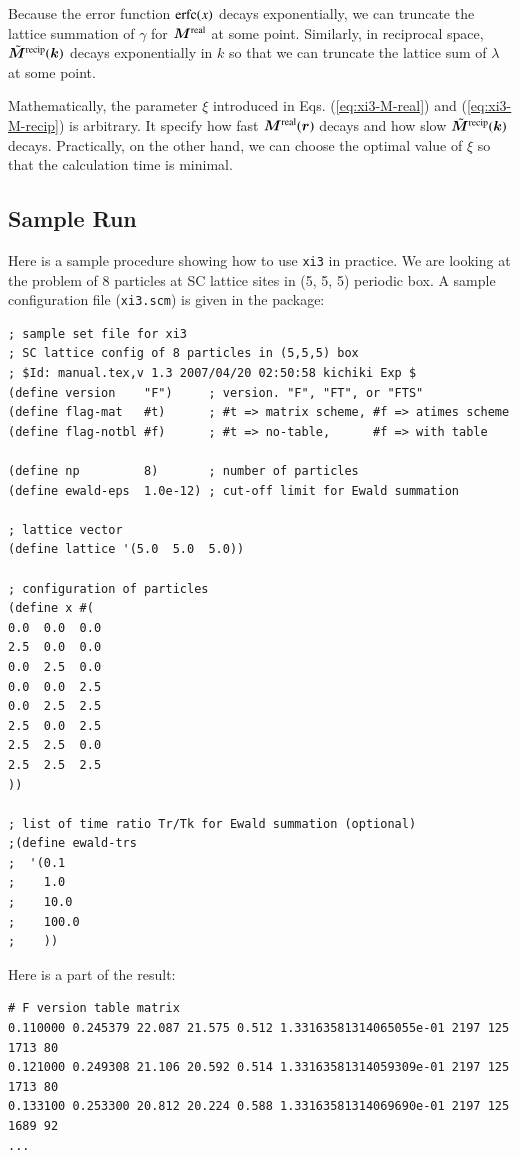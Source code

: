 \documentclass{book}
\begin{document}
Because the error function ${\rm erfc}(x)$ decays exponentially,
we can truncate the lattice summation of $\gamma$ for $\bm{M}^{\rm real}$
at some point.
Similarly, in reciprocal space, $\tilde{\bm{M}}^{\rm recip}(\bm{k})$
decays exponentially in $k$ so that we can truncate the lattice sum
of $\lambda$ at some point.

Mathematically, the parameter $\xi$ introduced in
Eqs. (\ref{eq:xi3-M-real}) and (\ref{eq:xi3-M-recip})
is arbitrary. It specify how fast $\bm{M}^{\rm real}(\bm{r})$ decays
and how slow $\tilde{\bm{M}}^{\rm recip}(\bm{k})$ decays.
Practically, on the other hand, we can choose the optimal value of $\xi$
so that the calculation time is minimal.


\subsection{Sample Run}
Here is a sample procedure showing how to use {\tt xi3} in practice.
We are looking at the problem of 8 particles at SC lattice sites
in (5, 5, 5) periodic box.
A sample configuration file ({\tt xi3.scm}) is given in the package:
{\small
\begin{verbatim}
; sample set file for xi3
; SC lattice config of 8 particles in (5,5,5) box
; $Id: manual.tex,v 1.3 2007/04/20 02:50:58 kichiki Exp $
(define version    "F")     ; version. "F", "FT", or "FTS"
(define flag-mat   #t)      ; #t => matrix scheme, #f => atimes scheme
(define flag-notbl #f)      ; #t => no-table,      #f => with table

(define np         8)       ; number of particles
(define ewald-eps  1.0e-12) ; cut-off limit for Ewald summation

; lattice vector
(define lattice '(5.0  5.0  5.0))

; configuration of particles
(define x #(
0.0  0.0  0.0
2.5  0.0  0.0
0.0  2.5  0.0
0.0  0.0  2.5
0.0  2.5  2.5
2.5  0.0  2.5
2.5  2.5  0.0
2.5  2.5  2.5
))

; list of time ratio Tr/Tk for Ewald summation (optional)
;(define ewald-trs
;  '(0.1
;    1.0
;    10.0
;    100.0
;    ))
\end{verbatim}
}
Here is a part of the result:
{\small
\begin{verbatim}
# F version table matrix
0.110000 0.245379 22.087 21.575 0.512 1.33163581314065055e-01 2197 125 1713 80
0.121000 0.249308 21.106 20.592 0.514 1.33163581314059309e-01 2197 125 1713 80
0.133100 0.253300 20.812 20.224 0.588 1.33163581314069690e-01 2197 125 1689 92
...
\end{verbatim}
}
\end{document}

